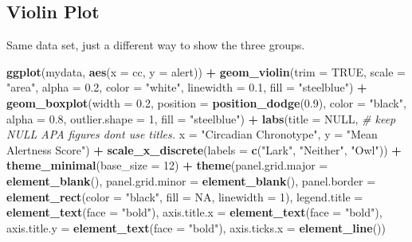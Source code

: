 \documentclass[
]{book}
\newenvironment{Shaded}{\begin{snugshade}}{\end{snugshade}}
\newcommand{\AttributeTok}[1]{\textcolor[rgb]{0.13,0.29,0.53}{#1}}
\newcommand{\CommentTok}[1]{\textcolor[rgb]{0.56,0.35,0.01}{\textit{#1}}}
\newcommand{\ConstantTok}[1]{\textcolor[rgb]{0.56,0.35,0.01}{#1}}
\newcommand{\DecValTok}[1]{\textcolor[rgb]{0.00,0.00,0.81}{#1}}
\newcommand{\FloatTok}[1]{\textcolor[rgb]{0.00,0.00,0.81}{#1}}
\newcommand{\FunctionTok}[1]{\textcolor[rgb]{0.13,0.29,0.53}{\textbf{#1}}}
\newcommand{\NormalTok}[1]{#1}
\newcommand{\SpecialCharTok}[1]{\textcolor[rgb]{0.81,0.36,0.00}{\textbf{#1}}}
\newcommand{\StringTok}[1]{\textcolor[rgb]{0.31,0.60,0.02}{#1}}
\let\oldsubsection\subsection
\renewcommand{\subsection}{\needspace{3\baselineskip}\oldsubsection}  %
\begin{document}
\subsection{Violin Plot}\label{violin-plot-1}

Same data set, just a different way to show the three groups.

\begin{Shaded}
\begin{Highlighting}[]
\FunctionTok{ggplot}\NormalTok{(mydata, }\FunctionTok{aes}\NormalTok{(}\AttributeTok{x =}\NormalTok{ cc, }\AttributeTok{y =}\NormalTok{ alert)) }\SpecialCharTok{+}
  \FunctionTok{geom\_violin}\NormalTok{(}\AttributeTok{trim =} \ConstantTok{TRUE}\NormalTok{, }\AttributeTok{scale =} \StringTok{"area"}\NormalTok{, }\AttributeTok{alpha =} \FloatTok{0.2}\NormalTok{, }\AttributeTok{color =} \StringTok{"white"}\NormalTok{, }\AttributeTok{linewidth =} \FloatTok{0.1}\NormalTok{, }\AttributeTok{fill =} \StringTok{"steelblue"}\NormalTok{) }\SpecialCharTok{+}
  \FunctionTok{geom\_boxplot}\NormalTok{(}\AttributeTok{width =} \FloatTok{0.2}\NormalTok{, }\AttributeTok{position =} \FunctionTok{position\_dodge}\NormalTok{(}\FloatTok{0.9}\NormalTok{), }\AttributeTok{color =} \StringTok{"black"}\NormalTok{, }\AttributeTok{alpha =} \FloatTok{0.8}\NormalTok{, }\AttributeTok{outlier.shape =} \DecValTok{1}\NormalTok{,}
               \AttributeTok{fill =} \StringTok{"steelblue"}\NormalTok{) }\SpecialCharTok{+}
  \FunctionTok{labs}\NormalTok{(}\AttributeTok{title =} \ConstantTok{NULL}\NormalTok{,   }\CommentTok{\# keep NULL APA figures don\textquotesingle{}t use titles.}
       \AttributeTok{x =} \StringTok{"Circadian Chronotype"}\NormalTok{,  }
       \AttributeTok{y =} \StringTok{"Mean Alertness Score"}\NormalTok{) }\SpecialCharTok{+}
  \FunctionTok{scale\_x\_discrete}\NormalTok{(}\AttributeTok{labels =} \FunctionTok{c}\NormalTok{(}\StringTok{"Lark"}\NormalTok{, }\StringTok{"Neither"}\NormalTok{, }\StringTok{"Owl"}\NormalTok{)) }\SpecialCharTok{+}
  \FunctionTok{theme\_minimal}\NormalTok{(}\AttributeTok{base\_size =} \DecValTok{12}\NormalTok{) }\SpecialCharTok{+}
  \FunctionTok{theme}\NormalTok{(}\AttributeTok{panel.grid.major =} \FunctionTok{element\_blank}\NormalTok{(),}
        \AttributeTok{panel.grid.minor =} \FunctionTok{element\_blank}\NormalTok{(),}
        \AttributeTok{panel.border =} \FunctionTok{element\_rect}\NormalTok{(}\AttributeTok{color =} \StringTok{"black"}\NormalTok{, }\AttributeTok{fill =} \ConstantTok{NA}\NormalTok{, }\AttributeTok{linewidth =} \DecValTok{1}\NormalTok{),}
        \AttributeTok{legend.title =} \FunctionTok{element\_text}\NormalTok{(}\AttributeTok{face =} \StringTok{"bold"}\NormalTok{),}
        \AttributeTok{axis.title.x =} \FunctionTok{element\_text}\NormalTok{(}\AttributeTok{face =} \StringTok{"bold"}\NormalTok{),}
        \AttributeTok{axis.title.y =} \FunctionTok{element\_text}\NormalTok{(}\AttributeTok{face =} \StringTok{"bold"}\NormalTok{),}
        \AttributeTok{axis.ticks.x =} \FunctionTok{element\_line}\NormalTok{())}
\end{Highlighting}
\end{Shaded}
\end{document}
